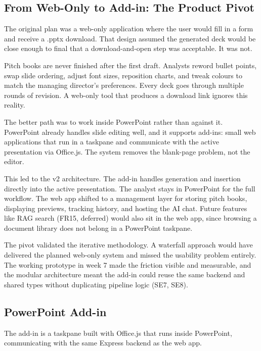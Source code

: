 \subsection{From Web-Only to Add-in: The Product Pivot}
\label{sec:pivot}

The original plan was a web-only application where the user would fill in a form and receive a .pptx download. That design assumed the generated deck would be close enough to final that a download-and-open step was acceptable. It was not.

Pitch books are never finished after the first draft. Analysts reword bullet points, swap slide ordering, adjust font sizes, reposition charts, and tweak colours to match the managing director's preferences. Every deck goes through multiple rounds of revision. A web-only tool that produces a download link ignores this reality.

The better path was to work inside PowerPoint rather than against it. PowerPoint already handles slide editing well, and it supports add-ins: small web applications that run in a taskpane and communicate with the active presentation via Office.js. The system removes the blank-page problem, not the editor.

This led to the v2 architecture. The add-in handles generation and insertion directly into the active presentation. The analyst stays in PowerPoint for the full workflow. The web app shifted to a management layer for storing pitch books, displaying previews, tracking history, and hosting the AI chat. Future features like RAG search (FR15, deferred) would also sit in the web app, since browsing a document library does not belong in a PowerPoint taskpane.

The pivot validated the iterative methodology. A waterfall approach would have delivered the planned web-only system and missed the usability problem entirely. The working prototype in week 7 made the friction visible and measurable, and the modular architecture meant the add-in could reuse the same backend and shared types without duplicating pipeline logic (SE7, SE8).

\subsection{PowerPoint Add-in}
\label{sec:addin}

The add-in is a taskpane built with Office.js that runs inside PowerPoint, communicating with the same Express backend as the web app.


